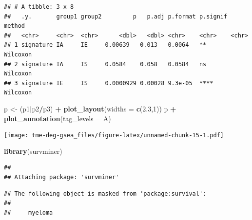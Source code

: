 \documentclass[
  12pt,
]{book}
\newenvironment{Shaded}{\begin{snugshade}}{\end{snugshade}}
\newcommand{\AttributeTok}[1]{\textcolor[rgb]{0.13,0.29,0.53}{#1}}
\newcommand{\DecValTok}[1]{\textcolor[rgb]{0.00,0.00,0.81}{#1}}
\newcommand{\FloatTok}[1]{\textcolor[rgb]{0.00,0.00,0.81}{#1}}
\newcommand{\FunctionTok}[1]{\textcolor[rgb]{0.13,0.29,0.53}{\textbf{#1}}}
\newcommand{\NormalTok}[1]{#1}
\newcommand{\OtherTok}[1]{\textcolor[rgb]{0.56,0.35,0.01}{#1}}
\newcommand{\SpecialCharTok}[1]{\textcolor[rgb]{0.81,0.36,0.00}{\textbf{#1}}}
\newcommand{\StringTok}[1]{\textcolor[rgb]{0.31,0.60,0.02}{#1}}
\begin{document}
\begin{verbatim}
## # A tibble: 3 x 8
##   .y.       group1 group2         p   p.adj p.format p.signif method  
##   <chr>     <chr>  <chr>      <dbl>   <dbl> <chr>    <chr>    <chr>   
## 1 signature IA     IE     0.00639   0.013   0.0064   **       Wilcoxon
## 2 signature IA     IS     0.0584    0.058   0.0584   ns       Wilcoxon
## 3 signature IE     IS     0.0000929 0.00028 9.3e-05  ****     Wilcoxon
\end{verbatim}

\begin{Shaded}
\begin{Highlighting}[]
\NormalTok{p }\OtherTok{\textless{}{-}}\NormalTok{ (p1}\SpecialCharTok{|}\NormalTok{p2}\SpecialCharTok{/}\NormalTok{p3) }\SpecialCharTok{+} \FunctionTok{plot\_layout}\NormalTok{(}\AttributeTok{widths =} \FunctionTok{c}\NormalTok{(}\FloatTok{2.3}\NormalTok{,}\DecValTok{1}\NormalTok{))}
\NormalTok{p }\SpecialCharTok{+} \FunctionTok{plot\_annotation}\NormalTok{(}\AttributeTok{tag\_levels =} \StringTok{\textquotesingle{}A\textquotesingle{}}\NormalTok{)}
\end{Highlighting}
\end{Shaded}

\texttt{[image: tme-deg-gsea\_files/figure-latex/unnamed-chunk-15-1.pdf]}

\begin{Shaded}
\begin{Highlighting}[]
\FunctionTok{library}\NormalTok{(survminer)}
\end{Highlighting}
\end{Shaded}

\begin{verbatim}
## 
## Attaching package: 'survminer'
\end{verbatim}

\begin{verbatim}
## The following object is masked from 'package:survival':
## 
##     myeloma
\end{verbatim}
\end{document}
